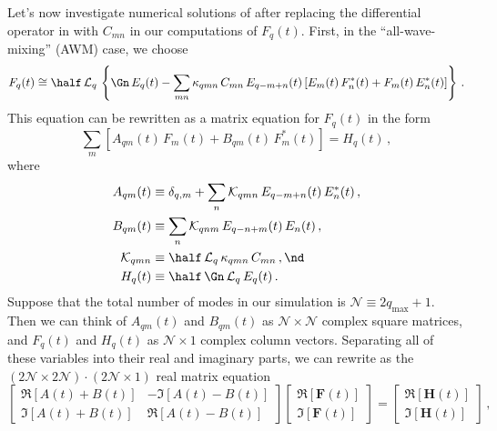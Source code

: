 Let's now investigate numerical solutions of  after replacing the differential operator in  with $C_{m n}$ in our computations of $F_q(t)$. First, in the ``all-wave-mixing'' (AWM) case, we choose
 \begin{equation} \label{eqn:mll_swl_fqt_awm}
 F_q(t) \cong \half\, \mathcal{L}_q\, \left\{ \Gn\, E_q(t) - \sum_{m n} \kappa_{q m n}\, C_{m n}\, E_{q - m + n}(t) \left[ E_m(t)\, F_n^\ast(t) + F_m(t)\, E_n^\ast(t) \right] \right\}\, .
 \end{equation}
This equation can be rewritten as a matrix equation for $F_q(t)$ in the form
 \begin{equation}\label{eqn:mll_1d_fqt_swl_awm}
\sum_m \left[ A_{q m}(t)\, F_m(t) + B_{q m}(t)\, F^\ast_m(t) \right] = H_q(t)\, ,
 \end{equation}
where
 \begin{align*}
A_{q m}(t) &\equiv \delta_{q, m} + \sum_n \mathcal{K}_{qmn}\, E_{q - m + n}(t)\, E_n^\ast(t)\, , \\
B_{q m}(t) &\equiv \sum_n \mathcal{K}_{qnm}\, E_{q - n + m}(t)\, E_n(t)\, , \\
\mathcal{K}_{qmn} &\equiv \half\, \mathcal{L}_q\, \kappa_{q m n}\, C_{m n}\, , \nd \\
H_q(t) &\equiv \half\, \Gn\, \mathcal{L}_q\, E_q(t)\, .
 \end{align*}
Suppose that the total number of modes in our simulation is $\mathcal{N} \equiv 2 q_\text{max} + 1$. Then we can think of $A_{q m}(t)$ and $B_{q m}(t)$ as $\mathcal{N} \times \mathcal{N}$ complex square matrices, and $F_q(t)$ and $H_q(t)$ as $\mathcal{N} \times 1$ complex column vectors. Separating all of these variables into their real and imaginary parts, we can rewrite  as the $(2 \mathcal{N} \times 2 \mathcal{N}) \cdot (2 \mathcal{N} \times 1)$ real matrix equation
 \begin{equation}\label{eqn:mml_1d_fqt_sw_mat}
\begin{bmatrix}
  \Re[A(t) + B(t)] & -\Im[A(t) - B(t)] \\
  \Im[A(t) + B(t)] & \Re[A(t) - B(t)]
\end{bmatrix} \begin{bmatrix}
                  \Re[\mathbf{F}(t)] \\
                  \Im[\mathbf{F}(t)]
                \end{bmatrix}
                 = \begin{bmatrix}
                  \Re[\mathbf{H}(t)] \\
                  \Im[\mathbf{H}(t)]
                \end{bmatrix}\, ,
 \end{equation}
